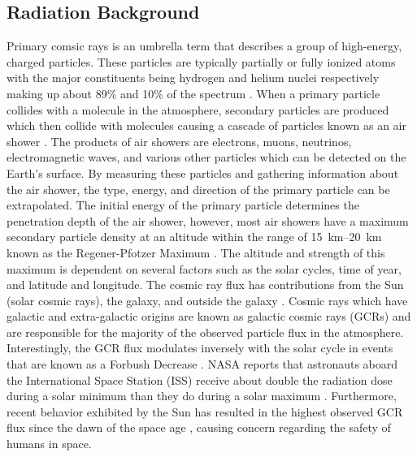 \subsection{Radiation Background}
\label{sec:Radiation-Background}

Primary comsic rays is an umbrella term that describes a group of high-energy, charged particles.
These particles are typically partially or fully ionized atoms with the major constituents being hydrogen and helium nuclei respectively making up about 89\% and 10\% of the spectrum \cite{Lemoine} \cite{CERN-Cosmic-Rays}.
When a primary particle collides with a molecule in the atmosphere, secondary particles are produced which then collide with molecules causing a cascade of particles known as an air shower \cite{Frank-Schroder}.
The products of air showers are electrons, muons, neutrinos, electromagnetic waves, and various other particles which can be detected on the Earth's surface.
By measuring these particles and gathering information about the air shower, the type, energy, and direction of the primary particle can be extrapolated.
The initial energy of the primary particle determines the penetration depth of the air shower, however, most air showers have a maximum secondary particle density at an altitude within the range of \SIrange{15}{20}{\kilo\meter} known as the Regener-Pfotzer Maximum \cite{Regener-Pfotzer} \cite{Secondary-Intensity-Balloons}.
The altitude and strength of this maximum is dependent on several factors such as the solar cycles, time of year, and latitude and longitude.
The cosmic ray flux has contributions from the Sun (solar cosmic rays), the galaxy, and outside the galaxy \cite{Frank-Schroder}.
Cosmic rays which have galactic and extra-galactic origins are known as galactic cosmic rays (GCRs) and are responsible for the majority of the observed particle flux in the atmosphere.
Interestingly, the GCR flux modulates inversely with the solar cycle in events that are known as a Forbush Decrease \cite{Secondary-Intensity-Balloons} \cite{Hathaway-Solar-Cycle} \cite{Forbush-Decrease}.
NASA reports that astronauts aboard the International Space Station (ISS) receive about double the radiation dose during a solar minimum than they do during a solar maximum \cite{NASA-Radiation-Book}.
Furthermore, recent behavior exhibited by the Sun has resulted in the highest observed GCR flux since the dawn of the space age \cite{Schwadron}, causing concern regarding the safety of humans in space.

